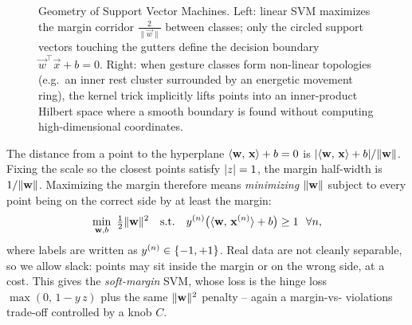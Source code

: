 \begin{figure}[H]
\caption{Geometry of Support Vector Machines. Left: linear SVM maximizes the margin corridor $\frac{2}{\|\vec{w}\|}$ between classes; only the circled support vectors touching the gutters define the decision boundary $\vec{w}^\top\vec{x}+b=0$. Right: when gesture classes form non-linear topologies (e.g.\ an inner rest cluster surrounded by an energetic movement ring), the kernel trick implicitly lifts points into an inner-product Hilbert space where a smooth boundary is found without computing high-dimensional coordinates.}
\label{ch39:fig-svm}
\end{figure}

The distance from a point to the hyperplane $\langle \mathbf{w},\, \mathbf{x} \rangle+b=0$ is
$\lvert\langle \mathbf{w},\, \mathbf{x} \rangle+b\rvert/\lVert\mathbf{w}\rVert$. Fixing the scale so the closest points
satisfy $\lvert z\rvert=1$, the margin half-width is $1/\lVert\mathbf{w}\rVert$. Maximizing the margin
therefore means \emph{minimizing} $\lVert\mathbf{w}\rVert$ subject to every point being on the
correct side by at least the margin:
\[
  \min_{\mathbf{w},b}\ \tfrac12\lVert\mathbf{w}\rVert^2
  \quad\text{s.t.}\quad
  y^{(n)}\big(\langle \mathbf{w},\, \mathbf{x}^{(n)} \rangle+b\big) \ge 1 \ \ \forall n,
\]
where labels are written as $y^{(n)}\in\{-1,+1\}$. Real data are not cleanly
separable, so we allow slack: points may sit inside the margin or on the wrong side, at
a cost. This gives the \emph{soft-margin} SVM, whose loss is the hinge loss
$\max(0,\,1 - y\,z)$ plus the same $\lVert\mathbf{w}\rVert^2$ penalty -- again a margin-vs-
violations trade-off controlled by a knob $C$.

